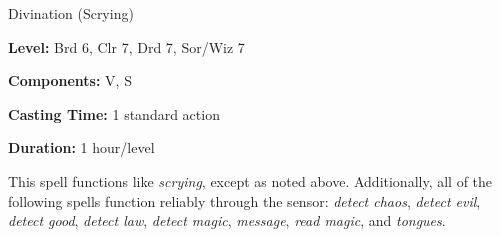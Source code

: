 \label{spell:Greater Scrying}

Divination (Scrying)

\textbf{Level:} Brd 6, Clr 7, Drd 7, Sor/Wiz 7

\textbf{Components:} V, S

\textbf{Casting Time:} 1 standard action

\textbf{Duration:} 1 hour/level

This spell functions like \textit{scrying}, except as noted above. Additionally, 
all of the following spells function reliably through the sensor: \textit{detect 
chaos}, \textit{detect evil}, \textit{detect good}, \textit{detect law}, \textit{detect 
magic}, \textit{message}, \textit{read magic}, and \textit{tongues}.

